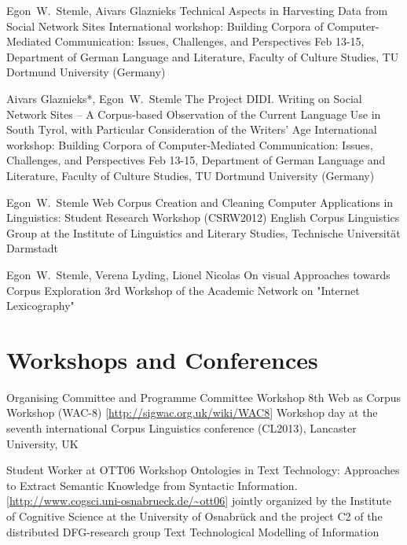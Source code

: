 \documentclass[11pt,a4paper]{moderncv}
\begin{document}
        {Egon~W.~Stemle, Aivars Glaznieks}
        {\small Technical Aspects in Harvesting Data from Social Network Sites}
        {\small International workshop: Building Corpora of Computer-Mediated
        Communication: Issues, Challenges, and Perspectives}
        {\small Feb 13-15, Department of German Language and Literature, Faculty of
        Culture Studies, TU Dortmund University (Germany)}
        {}

        {Aivars Glaznieks*, Egon~W.~Stemle}
        {\small The Project DIDI. Writing on Social Network Sites -- A
        Corpus-based Observation of the Current Language Use in South Tyrol,
        with Particular Consideration of the Writers’ Age} 
        {\small International workshop: Building Corpora of Computer-Mediated
        Communication: Issues, Challenges, and Perspectives}
        {\small Feb 13-15, Department of German Language and Literature, Faculty of
        Culture Studies, TU Dortmund University (Germany)}
        {}

        {Egon~W.~Stemle}
        {Web Corpus Creation and Cleaning}
        {\small Computer Applications in Linguistics: Student Research Workshop (CSRW2012)}
        {\small English Corpus Linguistics Group at the Institute of
        Linguistics and Literary Studies, Technische Universit\"{a}t Darmstadt}
        {}

        {Egon~W.~Stemle, Verena Lyding, Lionel Nicolas}
        {\small On visual Approaches towards Corpus Exploration}
        {\small 3rd Workshop of the Academic Network on "Internet Lexicography"}
        {\small}
        {}

\closesection{}


\section{Workshops and Conferences}
        {Organising Committee and Programme Committee}
        {Workshop}
        {8th Web as Corpus Workshop (WAC-8)}
        {[\url{http://sigwac.org.uk/wiki/WAC8}]}
        {Workshop day at the seventh international Corpus Linguistics
        conference (CL2013), Lancaster University, UK}

        {Student Worker at OTT06}
        {Workshop}
        {Ontologies in Text Technology: Approaches to Extract Semantic
        Knowledge from Syntactic Information.}
        {[\url{http://www.cogsci.uni-osnabrueck.de/~ott06}]}
        {jointly organized by the Institute of Cognitive Science at the
        University of Osnabr\"{u}ck and the project C2 of the distributed
        DFG-research group Text Technological Modelling of Information}
\end{document}
